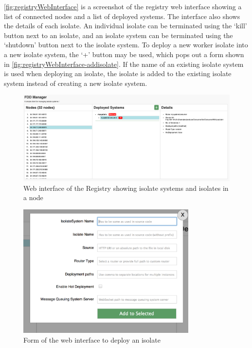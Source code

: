   \autoref{fig:registryWebInterface} is a screenshot of the registry web interface showing a list of connected nodes and a list of deployed systems. The interface also shows the details of each isolate. An individual isolate can be terminated using the ‘kill’ button next to an isolate, and an isolate system can be terminated using the ‘shutdown’ button next to the isolate system. To deploy a new worker isolate into a new isolate system, the ‘+’ button may be used, which pops out a form shown in \autoref{fig:registryWebInterface-addisolate}. If the name of an existing isolate system is used when deploying an isolate, the isolate is added to the existing isolate system instead of creating a new isolate system.

\begin{figure}[H]
  \centering
  \includegraphics[width=1\textwidth]{figures/webinterface}
  \caption[Web interface of the Registry showing isolate systems and isolates in a node]{Web interface of the Registry showing isolate systems and isolates in a node}
  \label{fig:registryWebInterface}
\end{figure}

\begin{figure}[H]
  \centering  \includegraphics[width=0.8\textwidth]{figures/webinterface-addisolate}
  \caption[Form of the web interface to deploy an isolate]{Form of the web interface to deploy an isolate}
  \label{fig:registryWebInterface-addisolate}
\end{figure}

